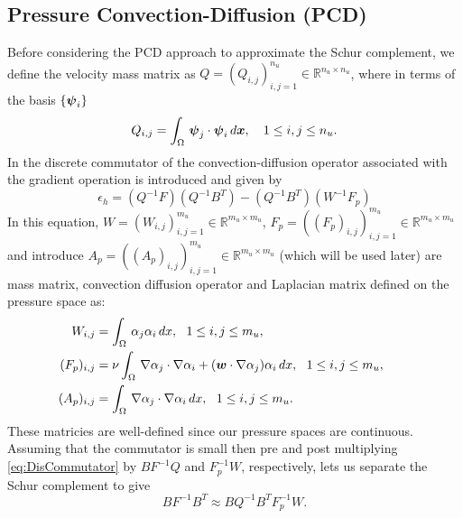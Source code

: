 \subsection{Pressure Convection-Diffusion (PCD)}
Before considering the PCD approach to approximate the Schur complement, we define the velocity mass matrix as $Q=(Q_{i,j})_{i,j=1}^{n_u} \in{\mathbb R}^{n_u \times n_u}$, where in terms of the basis $\{\boldsymbol \psi_i\}$
\begin{equation}
\label{eq:pressure_mass}
Q_{i,j}=
\int_\Omega\, \boldsymbol \psi_j\cdot \boldsymbol \psi_i \,d\boldsymbol x, \quad 1\leq i,j \leq n_u.
\end{equation}
In \cite[Chap. 8]{elman2005finite} the discrete commutator of the convection-diffusion operator associated with the gradient operation is introduced and given by
\begin{equation} \label{eq:DisCommutator}
    \epsilon_h = (Q^{-1}F)(Q^{-1}B^T)-(Q^{-1}B^T)(W^{-1}F_p)
\end{equation}
In this equation, $W=(W_{i,j})_{i,j=1}^{m_u} \in{\mathbb R}^{m_u \times m_u}$, $F_p=((F_{p})_{i,j})_{i,j=1}^{m_u} \in{\mathbb R}^{m_u \times m_u}$ and introduce $A_p=((A_{p})_{i,j})_{i,j=1}^{m_u} \in{\mathbb R}^{m_u \times m_u}$ (which will be used later) are mass matrix, convection diffusion operator and Laplacian matrix defined on the pressure space as:
\begin{equation}
\label{eq:PressureMass}
 \left. \begin{aligned}
W_{i,j}&= \int_\Omega\, \alpha_j \alpha_i \,dx, \ \ 1\leq i,j \leq m_u, \\
(F_{p})_{i,j}&= \nu \int_\Omega\, \nabla \alpha_j \cdot \nabla \alpha_i +(\boldsymbol w \cdot \nabla \alpha_j)\alpha_i\,dx,\ \ 1\leq i,j \leq m_u, \\
(A_{p})_{i,j}&=  \int_\Omega\, \nabla \alpha_j \cdot \nabla \alpha_i \,dx, \ \ 1\leq i,j \leq m_u.
 \end{aligned}
 \right.
 \qquad \text{}
\end{equation}
These matricies are well-defined since our pressure spaces are continuous. Assuming that the commutator is small then pre and post multiplying \eqref{eq:DisCommutator} by $B F^{-1} Q$ and $F_p^{-1}W$, respectively, lets us separate the Schur complement to give
\begin{equation} \label{eq:SchurApprox}
    BF^{-1}B^T \approx B Q^{-1}B^T F_p^{-1} W.
\end{equation}

